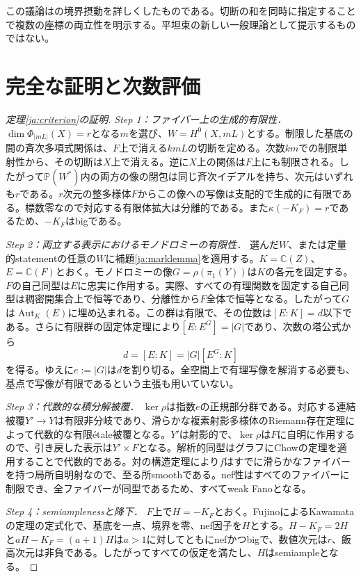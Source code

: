 \documentclass[12pt]{amsart}
\theoremstyle{definition}
\theoremstyle{remark}
\numberwithin{equation}{section}
\DeclareMathOperator{\Autop}{Aut}
\newcommand{\C}{\mathbb{C}}
\newcommand{\mP}{\mathbb{P}}
\begin{document}
この議論は\cite[Theorem 1.6の証明、Step 3]{ja:EIM}の境界摂動を詳しくしたものである。切断の和を同時に指定することで複数の座標の両立性を明示する。平坦束の新しい一般理論として提示するものではない。

\section{完全な証明と次数評価}\label{ja:proof}
\begin{proof}[定理\ref{ja:criterion}の証明]
\textit{Step 1：ファイバー上の生成的有限性．}
$\dim\Phi_{|mL|}(X)=r$となる$m$を選び、$W=H^0(X,mL)$とする。制限した基底の間の斉次多項式関係は、$F$上で消える$kmL$の切断を定める。次数$km$での制限単射性から、その切断は$X$上で消える。逆に$X$上の関係は$F$上にも制限される。したがって$\mP(W^*)$内の両方の像の閉包は同じ斉次イデアルを持ち、次元はいずれも$r$である。$r$次元の整多様体$F$からこの像への写像は支配的で生成的に有限である。標数零なので対応する有限体拡大は分離的である。また$\kappa(-K_F)=r$であるため、$-K_F$はbigである。

\textit{Step 2：両立する表示におけるモノドロミーの有限性．}
選んだ$W$、または定量的statementの任意の$W$に補題\ref{ja:marklemma}を適用する。$K=\C(Z)$、$E=\C(F)$とおく。モノドロミーの像$G=\rho(\pi_1(Y))$は$K$の各元を固定する。$F$の自己同型は$E$に忠実に作用する。実際、すべての有理関数を固定する自己同型は稠密開集合上で恒等であり、分離性から$F$全体で恒等となる。したがって$G$は$\Autop_K(E)$に埋め込まれる。この群は有限で、その位数は$[E:K]=d$以下である。さらに有限群の固定体定理\cite[Tag 09I3]{ja:Stacks}により$[E:E^G]=|G|$であり、次数の塔公式から
\[
 d=[E:K]=|G|[E^G:K]
\]
を得る。ゆえに$e:=|G|$は$d$を割り切る。全空間上で有理写像を解消する必要も、基点で写像が有限であるという主張も用いていない。

\textit{Step 3：代数的な積分解被覆．}
$\ker\rho$は指数$e$の正規部分群である。対応する連結被覆$Y'\to Y$は有限非分岐であり、滑らかな複素射影多様体のRiemann存在定理\cite[Expos\'e XII, Theorem 5.1]{ja:SGA}によって代数的な有限étale被覆となる。$Y'$は射影的で、$\ker\rho$は$F$に自明に作用するので、引き戻した表示は$Y'\times F$となる。解析的同型はグラフにChowの定理を適用することで代数的である\cite[Section 4, Proposition 14]{ja:Serre}。対の構造定理により$f$はすでに滑らかなファイバーを持つ局所自明射なので、至る所smoothである。nef性はすべてのファイバーに制限でき、全ファイバーが同型であるため、すべてweak Fanoとなる。

\textit{Step 4：semiamplenessと降下．}
$F$上で$H=-K_F$とおく。FujinoによるKawamataの定理の定式化\cite[Theorem 1.1]{ja:Fuj}で、基底を一点、境界を零、nef因子を$H$とする。$H-K_F=2H$と$aH-K_F=(a+1)H$は$a>1$に対してともにnefかつbigで、数値次元は$r$、飯高次元は非負である。したがってすべての仮定を満たし、$H$はsemiampleとなる。


\end{proof}
\end{document}
